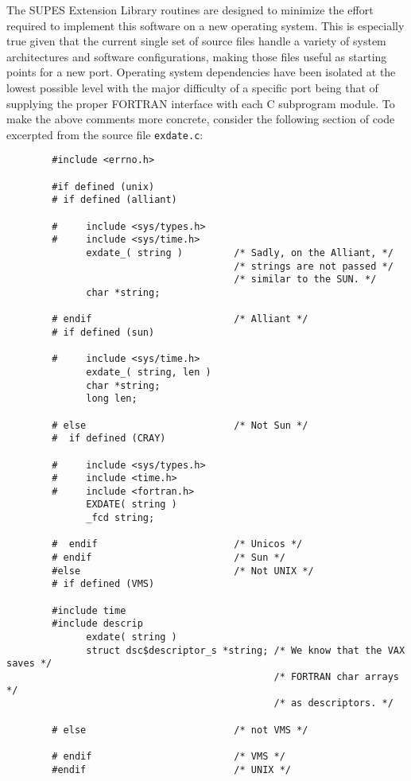 The SUPES Extension Library routines are designed to minimize the
effort required to implement this software on a new operating system.
This is especially true given that the current single set of source files handle
a variety of system architectures and software configurations,
making those files useful as starting points for a new port.
Operating system dependencies have
been isolated at the lowest possible level with the major difficulty
of a specific port being that of supplying the proper FORTRAN interface
with each C subprogram module.
To make the above comments more concrete,
consider the following section of code excerpted from the source
file \verb+exdate.c+:
\begin{verbatim}
        #include <errno.h>

        #if defined (unix)
        # if defined (alliant)

        #     include <sys/types.h>
        #     include <sys/time.h>
              exdate_( string )         /* Sadly, on the Alliant, */
                                        /* strings are not passed */
                                        /* similar to the SUN. */
              char *string;

        # endif                         /* Alliant */
        # if defined (sun)

        #     include <sys/time.h>
              exdate_( string, len )
              char *string;
              long len;

        # else                          /* Not Sun */
        #  if defined (CRAY)

        #     include <sys/types.h>
        #     include <time.h>
        #     include <fortran.h>
              EXDATE( string )
              _fcd string;

        #  endif                        /* Unicos */
        # endif                         /* Sun */
        #else                           /* Not UNIX */
        # if defined (VMS)

        #include time
        #include descrip
              exdate( string )
              struct dsc$descriptor_s *string; /* We know that the VAX saves */
                                               /* FORTRAN char arrays */
                                               /* as descriptors. */

        # else                          /* not VMS */

        # endif                         /* VMS */
        #endif                          /* UNIX */
\end{verbatim}
